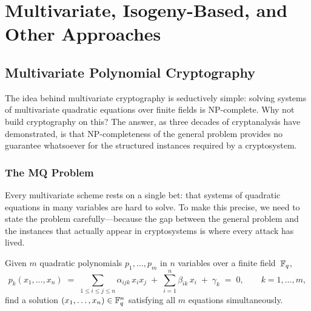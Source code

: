 \chapter{Multivariate, Isogeny-Based, and Other Approaches}
\label{ch:other-approaches}




\section{Multivariate Polynomial Cryptography}
\label{sec:multivariate}

The idea behind multivariate cryptography is seductively simple: solving systems of multivariate quadratic equations over finite fields is NP-complete.  Why not build cryptography on this?  The answer, as three decades of cryptanalysis have demonstrated, is that NP-completeness of the general problem provides no guarantee whatsoever for the structured instances required by a cryptosystem.

\subsection{The MQ Problem}
\label{subsec:mq-problem}

Every multivariate scheme rests on a single bet: that systems of quadratic equations in many variables are hard to solve.  To make this precise, we need to state the problem carefully---because the gap between the general problem and the instances that actually appear in cryptosystems is where every attack has lived.

\begin{definition}
\label{def:mq}
Given $m$ quadratic polynomials $p_1,\ldots,p_m$ in $n$ variables over a finite field~$\mathbb{F}_q$,
\begin{equation}
\label{eq:mq}
p_k(x_1, \ldots, x_n) \;=\; \sum_{1\leq i \leq j \leq n} \alpha_{ijk}\, x_i x_j \;+\; \sum_{i=1}^{n} \beta_{ik}\, x_i \;+\; \gamma_k \;=\; 0, \qquad k = 1,\ldots,m,
\end{equation}
find a solution $(x_1,\ldots,x_n)\in\mathbb{F}_q^n$ satisfying all $m$ equations simultaneously.
\end{definition}

